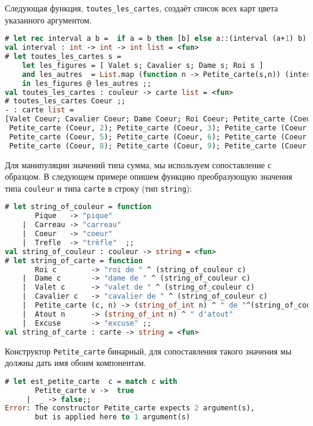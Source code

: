 Следующая функция, \texttt{toutes\_les\_cartes}, создаёт список всех карт цвета
указанного аргументом.

\begin{lstlisting}[language=OCaml]
# let rec interval a b =  if a = b then [b] else a::(interval (a+1) b) ;;
val interval : int -> int -> int list = <fun>
# let toutes_les_cartes s =
    let les_figures = [ Valet s; Cavalier s; Dame s; Roi s ]
    and les_autres  = List.map (function n -> Petite_carte(s,n)) (interval 1 10)
    in les_figures @ les_autres ;;
val toutes_les_cartes : couleur -> carte list = <fun>
# toutes_les_cartes Coeur ;;
- : carte list =
[Valet Coeur; Cavalier Coeur; Dame Coeur; Roi Coeur; Petite_carte (Coeur, 1);
 Petite_carte (Coeur, 2); Petite_carte (Coeur, 3); Petite_carte (Coeur, 4);
 Petite_carte (Coeur, 5); Petite_carte (Coeur, 6); Petite_carte (Coeur, 7);
 Petite_carte (Coeur, 8); Petite_carte (Coeur, 9); Petite_carte (Coeur, 10)]
\end{lstlisting}

Для манипуляции значений типа сумма, мы используем сопоставление с образцом. В
следующем примере опишем функцию преобразующую значения типа \texttt{couleur} и
типа \texttt{carte} в строку (тип \texttt{string}):

\begin{lstlisting}[language=OCaml]
# let string_of_couleur = function
       Pique   -> "pique"
    |  Carreau -> "carreau"
    |  Coeur   -> "coeur"
    |  Trefle  -> "trèfle"  ;;
val string_of_couleur : couleur -> string = <fun>
# let string_of_carte = function
       Roi c        -> "roi de " ^ (string_of_couleur c)
    |  Dame c       -> "dame de " ^ (string_of_couleur c)
    |  Valet c      -> "valet de " ^ (string_of_couleur c)
    |  Cavalier c   -> "cavalier de " ^ (string_of_couleur c)
    |  Petite_carte (c, n) -> (string_of_int n) ^ " de "^(string_of_couleur c)
    |  Atout n      -> (string_of_int n) ^ " d'atout"
    |  Excuse       -> "excuse" ;;
val string_of_carte : carte -> string = <fun>
\end{lstlisting}

Конструктор \texttt{Petite\_carte} бинарный, для сопоставления такого значения
мы должны дать имя обоим компонентам.

\begin{lstlisting}[language=OCaml]
# let est_petite_carte  c = match c with
       Petite_carte v ->  true
     |  _ -> false;;
Error: The constructor Petite_carte expects 2 argument(s),
       but is applied here to 1 argument(s)
\end{lstlisting}

